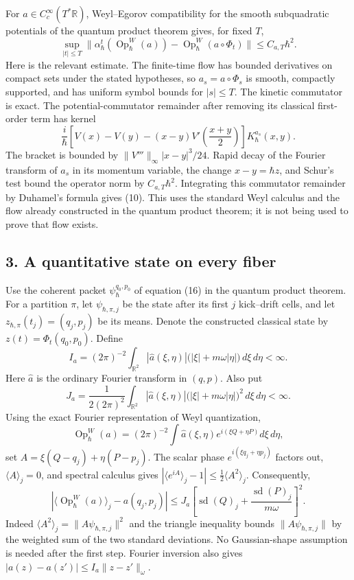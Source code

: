 \documentclass[11pt,a4paper]{article}
\begin{document}
For \(a\in C_c^\infty(T^*\mathbb R)\), Weyl--Egorov compatibility for
the smooth subquadratic potentials of the quantum product theorem gives,
for fixed \(T\), \[
 \sup_{|t|\le T}
 \|\alpha_\hbar^t(\operatorname{Op}_\hbar^W(a))
      -\operatorname{Op}_\hbar^W(a\circ\Phi_t)\|
 \le C_{a,T}\hbar^2.\tag{10}
\] Here is the relevant estimate. The finite-time flow has bounded
derivatives on compact sets under the stated hypotheses, so
\(a_s=a\circ\Phi_s\) is smooth, compactly supported, and has uniform
symbol bounds for \(|s|\le T\). The kinetic commutator is exact. The
potential-commutator remainder after removing its classical first-order
term has kernel \[
 \frac{i}{\hbar}\left[V(x)-V(y)-(x-y)V'\!\left(\frac{x+y}{2}\right)\right]
 K_\hbar^{a_s}(x,y).\tag{10a}
\] The bracket is bounded by \(\|V'''\|_\infty|x-y|^3/24\). Rapid decay
of the Fourier transform of \(a_s\) in its momentum variable, the change
\(x-y=\hbar z\), and Schur's test bound the operator norm by
\(C_{a,T}\hbar^2\). Integrating this commutator remainder by Duhamel's
formula gives (10). This uses the standard Weyl calculus and the flow
already constructed in the quantum product theorem; it is not being used
to prove that flow exists.

\subsection{3. A quantitative state on every
fiber}\label{a-quantitative-state-on-every-fiber}

Use the coherent packet \(\psi_\hbar^{q_0,p_0}\) of equation (16) in the
quantum product theorem. For a partition \(\pi\), let
\(\psi_{\hbar,\pi,j}\) be the state after its first \(j\) kick--drift
cells, and let \(z_{\hbar,\pi}(t_j)=(q_j,p_j)\) be its means. Denote the
constructed classical state by \(z(t)=\Phi_t(q_0,p_0)\). Define \[
 I_a=(2\pi)^{-2}\int_{\mathbb R^2}
 |\widehat a(\xi,\eta)|\big(|\xi|+m\omega|\eta|\big)
 \,d\xi\,d\eta<\infty.\tag{11}
\] Here \(\widehat a\) is the ordinary Fourier transform in \((q,p)\).
Also put \[
 J_a=\frac1{2(2\pi)^2}\int_{\mathbb R^2}
 |\widehat a(\xi,\eta)|\big(|\xi|+m\omega|\eta|\big)^2
 \,d\xi\,d\eta<\infty.\tag{11a}
\] Using the exact Fourier representation of Weyl quantization,
\[\operatorname{Op}_\hbar^W(a)
 =(2\pi)^{-2}\int\widehat a(\xi,\eta)
             e^{i(\xi Q+\eta P)}d\xi\,d\eta,\tag{12}\] set
\(A=\xi(Q-q_j)+\eta(P-p_j)\). The scalar phase
\(e^{i(\xi q_j+\eta p_j)}\) factors out, \(\langle A\rangle_j=0\), and
spectral calculus gives \(|\langle e^{iA}\rangle_j-1|
 \le\tfrac12\langle A^2\rangle_j\). Consequently, \[
 |\langle\operatorname{Op}_\hbar^W(a)\rangle_j-a(q_j,p_j)|
 \le J_a\!\left[
 \operatorname{sd}(Q)_j+\frac{\operatorname{sd}(P)_j}{m\omega}
 \right]^2.\tag{13}
\] Indeed \(\langle A^2\rangle_j=\|A\psi_{\hbar,\pi,j}\|^2\) and the
triangle inequality bounds \(\|A\psi_{\hbar,\pi,j}\|\) by the weighted
sum of the two standard deviations. No Gaussian-shape assumption is
needed after the first step. Fourier inversion also gives
\(|a(z)-a(z')|\le I_a\|z-z'\|_\omega\).
\end{document}
